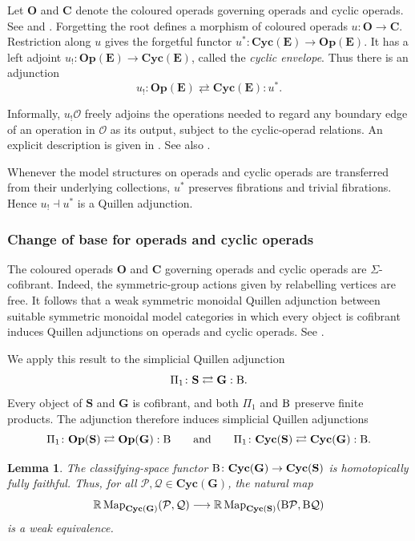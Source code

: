 \documentclass{amsart}
\newcommand{\bE}{\mathbf{E}}
\newcommand{\calQ}{\mathcal{Q}}
\newcommand{\sSet}{\mathbf{S}}
\newcommand{\Grpd}{\mathbf{G}}
\newcommand{\calP}{\mathcal{P}}
\newcommand{\Cyc}{\mathbf{Cyc}}
\newcommand{\Op}{\mathbf{Op}}
\newcommand{\Map}{\operatorname{Map}}
\newcommand{\cs}{\textnormal{B}}
\newtheorem{lemma}[theorem]{Lemma}%
\theoremstyle{definition}
\numberwithin{equation}{section}
\begin{document}
Let $\mathbf O$ and $\mathbf C$ denote the coloured operads governing
operads and cyclic operads. See
\cite[Example~1.5.6]{bm_resolutions} and
\cite[Definition~2.9]{cacti}. Forgetting the root defines a morphism
of coloured operads
$u\colon\mathbf O\to\mathbf C$. Restriction along $u$ gives the
forgetful functor
$u^*\colon\Cyc(\bE)\to\Op(\bE)$. It has a left adjoint
$u_!\colon\Op(\bE)\to\Cyc(\bE)$, called the \emph{cyclic envelope}.
Thus there is an adjunction
\[
u_!\colon\Op(\bE)
\rightleftarrows
\Cyc(\bE):u^*.
\]

Informally, $u_!\mathcal O$ freely adjoins the operations needed to
regard any boundary edge of an operation in $\mathcal O$ as its
output, subject to the cyclic-operad relations. An explicit
description is given in
\cite[Section~3.1 and Proposition~3.4]{DCH}. See also
\cite[Section~9]{Ward}.

Whenever the model structures on operads and cyclic operads are
transferred from their underlying collections, $u^*$ preserves
fibrations and trivial fibrations. Hence $u_!\dashv u^*$ is a
Quillen adjunction.
\subsubsection{Change of base for operads and cyclic operads}

The coloured operads $\mathbf O$ and $\mathbf C$ governing operads
and cyclic operads are $\Sigma$-cofibrant. Indeed, the
symmetric-group actions given by relabelling vertices are free. It
follows that a weak symmetric monoidal Quillen adjunction between
suitable symmetric monoidal model categories in which every object
is cofibrant induces Quillen adjunctions on operads and cyclic
operads. See
\cite[Proposition~5.2 and Theorem~5.8]{hry_shrink}.

We apply this result to the simplicial Quillen adjunction
\[
\Pi_1\colon\sSet
\rightleftarrows
\Grpd:\cs.
\]
Every object of $\sSet$ and $\Grpd$ is cofibrant, and both $\Pi_1$
and $\cs$ preserve finite products. The adjunction therefore induces
simplicial Quillen adjunctions
\[
\Pi_1\colon\Op(\sSet)
\rightleftarrows
\Op(\Grpd):\cs
\qquad\text{and}\qquad
\Pi_1\colon\Cyc(\sSet)
\rightleftarrows
\Cyc(\Grpd):\cs.
\]

\begin{lemma}
\label{lemma: B is homotopically fully faithful}
The classifying-space functor
$\cs\colon\Cyc(\Grpd)\to\Cyc(\sSet)$ is homotopically fully
faithful. Thus, for all $\calP,\calQ\in\Cyc(\Grpd)$, the natural map
\[
\mathbb R\Map_{\Cyc(\Grpd)}(\calP,\calQ)
\longrightarrow
\mathbb R\Map_{\Cyc(\sSet)}(\cs\calP,\cs\calQ)
\]
is a weak equivalence.
\end{lemma}
\end{document}
